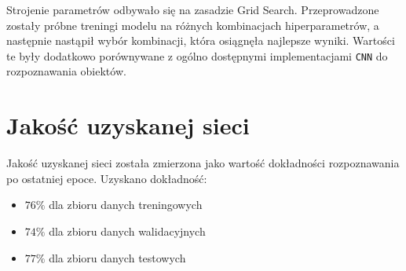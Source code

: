 \documentclass[11pt]{article}
\begin{document}
	Strojenie parametrów odbywało się na zasadzie Grid Search. Przeprowadzone zostały próbne treningi modelu na różnych kombinacjach hiperparametrów, a następnie nastąpił wybór kombinacji,
	która osiągnęła najlepsze wyniki. Wartości te były dodatkowo porównywane z ogólno dostępnymi implementacjami \texttt{CNN} do rozpoznawania obiektów.

	\section {Jakość uzyskanej sieci}
	Jakość uzyskanej sieci została zmierzona jako wartość dokładności rozpoznawania po ostatniej epoce. Uzyskano dokładność:
	\begin{itemize}
		\item $76\%$ dla zbioru danych treningowych
		\item $74\%$ dla zbioru danych walidacyjnych
		\item $77\%$ dla zbioru danych testowych
	\end{itemize}
\end{document}
